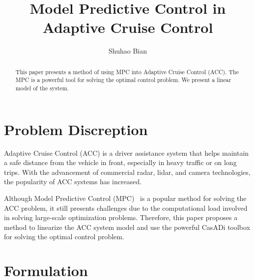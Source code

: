 \documentclass{article}
\title{Model Predictive Control in Adaptive Cruise Control}
\author{Shuhao Bian}
\numberwithin{equation}{section}
\begin{document}
\maketitle

\begin{abstract}
    This paper presents a method of using MPC into Adaptive Cruise Control (ACC). 
    The MPC is a powerful tool for solving the optimal control problem. 
    We present a linear model of the system. %
\end{abstract}

\section{Problem Discreption}


Adaptive Cruise Control (ACC) is a driver assistance system that helps maintain a safe 
distance from the vehicle in front, especially in heavy traffic or on long trips. With 
the advancement of commercial radar, lidar, and camera technologies, the popularity of 
ACC systems has increased.

Although Model Predictive Control (MPC)~\cite{rawlings2012postface} is a popular method for solving the ACC problem, 
it still presents challenges due to the computational load involved in solving large-scale 
optimization problems. Therefore, this paper proposes a method to linearize the ACC system 
model and use the powerful CasADi toolbox\cite{Andersson2018} for solving the optimal control 
problem.

\section{Formulation}
\end{document}
